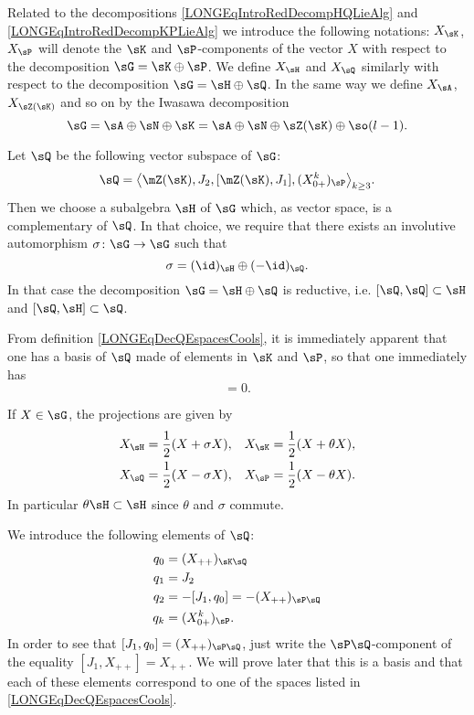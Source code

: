Related to the decompositions \eqref{LONGEqIntroRedDecompHQLieAlg} and \eqref{LONGEqIntroRedDecompKPLieAlg} we introduce the following notations: $X_{\sK}$, $X_{\sP}$ will denote the $\sK$ and $\sP$-components of the vector $X$ with respect to the decomposition $\sG=\sK\oplus\sP$. We define $X_{\sH}$ and $X_{\sQ}$ similarly with respect to the decomposition $\sG=\sH\oplus\sQ$. In the same way we define $X_{\sA}$, $X_{\sZ(\sK)}$ and so on by the Iwasawa decomposition
\begin{equation}
    \sG=\sA\oplus\sN\oplus\sK=\sA\oplus\sN\oplus\sZ(\sK)\oplus\so(l-1).
\end{equation}

Let $\sQ$ be the following vector subspace of $\sG$:
\begin{equation}		\label{LONGEqDecQEspacesCools}	%
	\sQ=\big\langle \mZ(\sK),J_2,[\mZ(\sK),J_1],(X_{0+}^k)_\sP\big\rangle_{k\geq 3}.
\end{equation}
Then we choose a subalgebra $\sH$ of $\sG$ which, as vector space, is a complementary of $\sQ$. In that choice, we require that there exists an involutive automorphism $\sigma\colon \sG\to \sG$ such that
\begin{equation}
	\sigma=(\id)_{\sH}\oplus(-\id)_{\sQ}.
\end{equation}
In that case the decomposition $\sG=\sH\oplus\sQ$ is reductive, i.e. $[\sQ,\sQ]\subset\sH$ and $[\sQ,\sH]\subset\sQ$.




From definition \eqref{LONGEqDecQEspacesCools}, it is immediately apparent that one has a basis of $\sQ$ made of elements in $\sK$ and $\sP$, so that one immediately has
\begin{equation}
	[\sigma,\theta]=0.
\end{equation}

If $X\in\sG$, the projections are given by
\begin{equation}		\label{LONGEqProjHQPKsigmatheta}
	\begin{aligned}[]
		X_{\sH}&=\frac{ 1 }{2}(X+\sigma X),		&X_{\sK}&=\frac{ 1 }{2}(X+\theta X),\\
		X_{\sQ}&=\frac{ 1 }{2}(X-\sigma X),		&X_{\sP}&=\frac{ 1 }{2}(X-\theta X).
	\end{aligned}
\end{equation}
In particular $\theta\sH\subset\sH$ since $\theta$ and $\sigma$ commute.

We introduce the following elements of $\sQ$:
\begin{equation}			\label{LONGAlignPRedDefQQ}
	\begin{aligned}[]
		q_0&=(X_{++})_{\sK\sQ}\\
		q_1&=J_2\\
		q_2&=-[J_1,q_0]=-(X_{++})_{\sP\sQ}\\
		q_k&=(X^k_{0+})_{\sP}.
	\end{aligned}
\end{equation}
In order to see that $[J_1,q_0]=(X_{++})_{\sP\sQ}$, just write the $\sP\sQ$-component of the equality $[J_1,X_{++}]=X_{++}$. We will prove later that this is a basis and that each of these elements correspond to one of the spaces listed in \eqref{LONGEqDecQEspacesCools}. 

